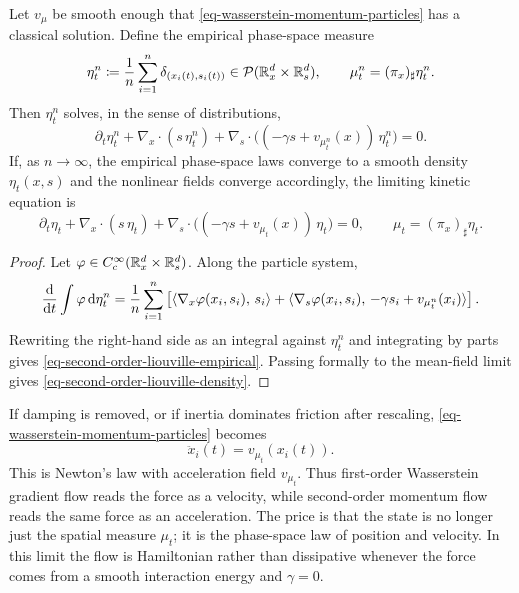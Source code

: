 \begin{prop}\label{prop-second-order-liouville}
	Let $v_\mu$ be smooth enough that \eqref{eq-wasserstein-momentum-particles} has a classical solution. Define the empirical phase-space measure
	\[
		\eta_t^n \coloneqq \frac1n\sum_{i=1}^n\delta_{(x_i(t),s_i(t))}
		\in \mathcal{P}(\mathbb{R}^d_x\times\mathbb{R}^d_s),
		\qquad
		\mu_t^n=(\pi_x)_\sharp\eta_t^n .
	\]
	Then $\eta_t^n$ solves, in the sense of distributions,
	\begin{equation}\label{eq-second-order-liouville-empirical}
		\partial_t\eta_t^n
		+
		\nabla_x\cdot(s\,\eta_t^n)
		+
		\nabla_s\cdot\bigl((-\gamma s+v_{\mu_t^n}(x))\,\eta_t^n\bigr)
		=0 .
	\end{equation}
	If, as $n\to\infty$, the empirical phase-space laws converge to a smooth density $\eta_t(x,s)$ and the nonlinear fields converge accordingly, the limiting kinetic equation is
	\begin{equation}\label{eq-second-order-liouville-density}
		\partial_t\eta_t
		+
		\nabla_x\cdot(s\,\eta_t)
		+
		\nabla_s\cdot\bigl((-\gamma s+v_{\mu_t}(x))\,\eta_t\bigr)
		=0,
		\qquad
		\mu_t=(\pi_x)_\sharp\eta_t .
	\end{equation}
\end{prop}
\begin{proof}
	Let $\varphi\in C_c^\infty(\mathbb{R}^d_x\times\mathbb{R}^d_s)$. Along the particle system,
	\[
		\frac{\mathrm{d}}{\mathrm{d} t}
		\int \varphi\,\mathrm{d}\eta_t^n
		=
		\frac1n\sum_{i=1}^n
		\left[
		\langle \nabla_x\varphi(x_i,s_i),\,s_i\rangle
		+
		\langle \nabla_s\varphi(x_i,s_i),\,-\gamma s_i+v_{\mu_t^n}(x_i)\rangle
		\right].
	\]
	Rewriting the right-hand side as an integral against $\eta_t^n$ and integrating by parts gives \eqref{eq-second-order-liouville-empirical}. Passing formally to the mean-field limit gives \eqref{eq-second-order-liouville-density}.
\end{proof}

\begin{rem}\label{rem-newtonian-momentum-limit}
	If damping is removed, or if inertia dominates friction after rescaling, \eqref{eq-wasserstein-momentum-particles} becomes
	\[
		\ddot x_i(t)=v_{\mu_t}(x_i(t)).
	\]
	This is Newton's law with acceleration field $v_{\mu_t}$. Thus first-order Wasserstein gradient flow reads the force as a velocity, while second-order momentum flow reads the same force as an acceleration. The price is that the state is no longer just the spatial measure $\mu_t$; it is the phase-space law of position and velocity. In this limit the flow is Hamiltonian rather than dissipative whenever the force comes from a smooth interaction energy and $\gamma=0$.
\end{rem}

